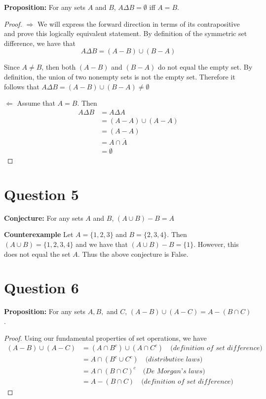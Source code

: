 \documentclass[11pt, oneside]{article}   	%
\begin{document}
\textbf{Proposition:} For any sets $A$ and $B$, $A\Delta B = \emptyset$ iff $A=B$.

\begin{proof}
$\Rightarrow$ We will express the forward direction in terms of its contrapositive  and prove this logically equivalent statement. By definition of the symmetric set difference, we have that
$$A \Delta B = (A - B) \cup (B - A)$$

Since $A \neq B$, then both $(A - B)$ and $(B-A)$ do not equal the empty set. By definition, the union of two nonempty sets is not the empty set. Therefore it follows that $A \Delta B = (A - B) \cup (B - A) \neq \emptyset$

$\Leftarrow$ Assume that $A = B$. Then
\begin{align*}
	A \Delta B & = A \Delta A \\
	& = (A-A) \cup (A-A) \\
	& = (A-A) \\
	& = A \cap \overline{A} \\
	& = \emptyset
\end{align*}
\end{proof}

\section*{Question 5}

\textbf{Conjecture:} For any sets $A$ and $B$, $(A \cup B) - B = A$

\textbf{Counterexample}
Let $A = \{1,2,3\}$ and $B=\{2,3,4\}$. Then $(A \cup B) = \{1,2,3,4\}$ and we have that $(A \cup B) - B = \{1\}$. However, this does not equal the set $A$. Thus the above conjecture is False.

\section*{Question 6}

\textbf{Proposition:} For any sets $A, B,$ and $C$, $(A-B) \cup (A-C) = A - (B \cap C)$.

\begin{proof}
Using our fundamental properties of set operations, we have 
\begin{align*}
	(A-B) \cup (A-C) & = (A \cap B^c) \cup (A \cap C^c) \quad \textit{(definition of set difference)}\\
	& = A \cap (B^c \cup C^c) \quad \textit{(distributive laws)} \\
	& = A \cap (B \cap C)^c \quad \textit{(De Morgan's laws)}\\
	& = A - (B \cap C) \quad \textit{(definition of set difference)}
\end{align*}
\end{proof}
\end{document}
